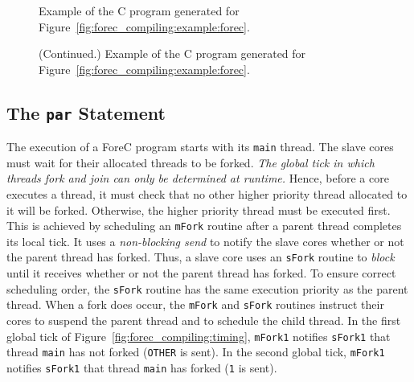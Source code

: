 \begin{figure}
	\centering

	

	\caption{Example of the C program generated for Figure~\ref{fig:forec_compiling:example:forec}.}
	\label{fig:forec_compiling:example:c1}
\end{figure}

\begin{figure}
	\ContinuedFloat 
	\centering

	

	\caption{(Continued.) Example of the C program generated for Figure~\ref{fig:forec_compiling:example:forec}.}
	\label{fig:forec_compiling:example:c2}
\end{figure}


\subsection{The \texttt{par} Statement}
\label{sec:forec_compiling:par}
The execution of a ForeC program starts with its \verb$main$
thread. The slave cores must wait for their allocated
threads to be forked. \emph{The global tick in which threads fork and
join can only be determined at runtime.} Hence, before a core
executes a thread, it must check that no other higher
priority thread allocated to it will be forked. Otherwise,
the higher priority thread must be executed first. This is
achieved by scheduling an \verb$mFork$ routine after a
parent thread completes its local tick. It uses a
\emph{non-blocking send} to notify the slave cores whether
or not the parent thread has forked. Thus, a slave core uses
an \verb$sFork$ routine to \emph{block} until it receives
whether or not the parent thread has forked. To ensure
correct scheduling order, the \verb$sFork$ routine has the
same execution priority as the parent thread. When a fork
does occur, the \verb$mFork$ and \verb$sFork$ routines
instruct their cores to suspend the parent thread and to
schedule the child thread. In the first 
global tick of Figure~\ref{fig:forec_compiling:timing},
\verb$mFork1$ notifies \verb$sFork1$ that thread \verb$main$
has not forked (\verb$OTHER$ is sent). In the second global tick, 
\verb$mFork1$ notifies \verb$sFork1$ that thread \verb$main$
has forked (\verb$1$ is sent).

